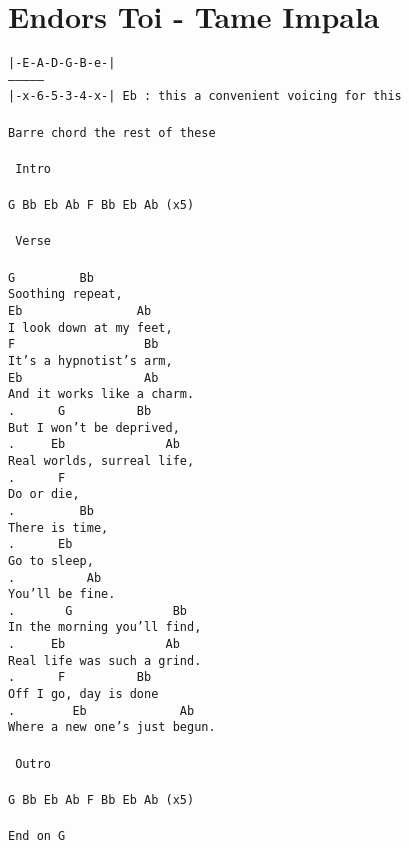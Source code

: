 \newpage
\section{Endors Toi - Tame Impala}
\label{Endors Toi - Tame Impala}
\texttt{|-E-A-D-G-B-e-|\\
---------------\\
|-x-6-5-3-4-x-| Eb : this a convenient voicing for this\\
\\
Barre chord the rest of these\\
\\
\lbrack\ Intro\rbrack\ \\
\\
G\ Bb\ Eb\ Ab\ F\ Bb\ Eb\ Ab\ (x5)\\
\\
\lbrack\ Verse\rbrack\\
\\
G\ \ \ \ \ \ \ \ \ Bb\\
Soothing\ repeat,\\
Eb\ \ \ \ \ \ \ \ \ \ \ \ \ \ \ \ Ab\\
I\ look\ down\ at\ my\ feet,\ \\
F\ \ \ \ \ \ \ \ \ \ \ \ \ \ \ \ \ \ Bb\\
It's\ a\ hypnotist's\ arm,\ \\
Eb\ \ \ \ \ \ \ \ \ \ \ \ \ \ \ \ \ Ab\\
And\ it\ works\ like\ a\ charm.\\
. \ \ \ \ \ G\ \ \ \ \ \ \ \ \ \ Bb\\
But\ I\ won't\ be\ deprived,\ \\
. \ \ \ \ Eb\ \ \ \ \ \ \ \ \ \ \ \ \ \ Ab\\
Real\ worlds,\ surreal\ life,\ \\
. \ \ \ \ \ F\\
Do\ or\ die,\ \\
. \ \ \ \ \ \ \ \ Bb\\
There\ is\ time,\ \\
. \ \ \ \ \ Eb\\
Go\ to\ sleep,\ \\
. \ \ \ \ \ \ \ \ \ Ab\\
You'll\ be\ fine.\\
. \ \ \ \ \ \ G\ \ \ \ \ \ \ \ \ \ \ \ \ \ Bb\\
In\ the\ morning\ you'll\ find,\ \\
. \ \ \ \ Eb\ \ \ \ \ \ \ \ \ \ \ \ \ \ Ab\\
Real\ life\ was\ such\ a\ grind.\\
. \ \ \ \ \ F\ \ \ \ \ \ \ \ \ \ Bb\\
Off\ I\ go,\ day\ is\ done\\
. \ \ \ \ \ \ \ Eb\ \ \ \ \ \ \ \ \ \ \ \ \ Ab\\
Where\ a\ new\ one's\ just\ begun.\\
\\
\lbrack\ Outro\rbrack\\
\\
G\ Bb\ Eb\ Ab\ F\ Bb\ Eb\ Ab\ (x5)\\
\\
End\ on\ G\ }
